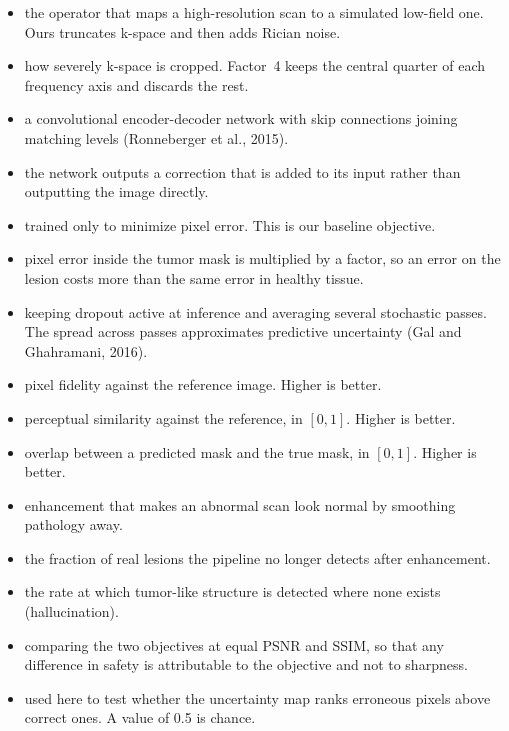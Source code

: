 \documentclass[11pt,a4paper]{article}
\begin{document}
\begin{itemize}
  \item {} the operator that maps a high-resolution scan to a simulated low-field one. Ours truncates k-space and then adds Rician noise.
  \item {} how severely k-space is cropped. Factor~4 keeps the central quarter of each frequency axis and discards the rest.
  \item {} a convolutional encoder-decoder network with skip connections joining matching levels (Ronneberger et al., 2015).
  \item {} the network outputs a correction that is added to its input rather than outputting the image directly.
  \item {} trained only to minimize pixel error. This is our baseline objective.
  \item {} pixel error inside the tumor mask is multiplied by a factor, so an error on the lesion costs more than the same error in healthy tissue.
  \item {} keeping dropout active at inference and averaging several stochastic passes. The spread across passes approximates predictive uncertainty (Gal and Ghahramani, 2016).
  \item {} pixel fidelity against the reference image. Higher is better.
  \item {} perceptual similarity against the reference, in $[0,1]$. Higher is better.
  \item {} overlap between a predicted mask and the true mask, in $[0,1]$. Higher is better.
  \item {} enhancement that makes an abnormal scan look normal by smoothing pathology away.
  \item {} the fraction of real lesions the pipeline no longer detects after enhancement.
  \item {} the rate at which tumor-like structure is detected where none exists (hallucination).
  \item {} comparing the two objectives at equal PSNR and SSIM, so that any difference in safety is attributable to the objective and not to sharpness.
  \item {} used here to test whether the uncertainty map ranks erroneous pixels above correct ones. A value of 0.5 is chance.
\end{itemize}
\end{document}
